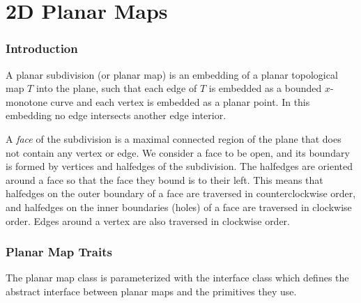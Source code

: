 



\chapter{2D Planar Maps}
\label{chap:planar_map_2_ref}
\subsection*{Introduction}

A planar subdivision (or planar map) is an embedding of a planar 
topological map $T$ 
into the plane, such that each edge of $T$ is embedded as a
bounded $x$-monotone curve and each vertex is embedded as a planar point.
In this embedding no
edge intersects another edge interior.

A {\em face} of the subdivision is a maximal connected region of the
plane that does not contain any vertex or edge. 
We consider a face to be open, and its boundary is
formed by vertices and halfedges of the subdivision.
The halfedges are oriented around a face so that the face they bound
is to their left. This means that halfedges on the outer boundary
of a face are traversed in counterclockwise order, and halfedges on the inner
boundaries (holes) of a face are traversed in clockwise order. Edges around a
vertex are also traversed in clockwise order. 

\subsection*{Planar Map Traits}
The planar map class is parameterized with the
interface class  which defines the abstract interface
between planar maps and the primitives they use. 

